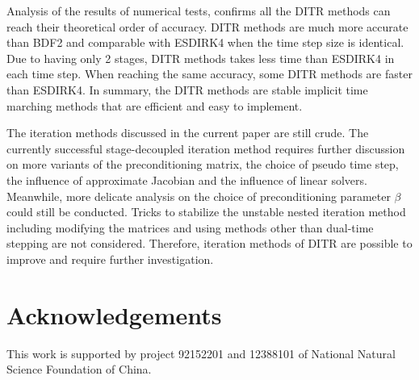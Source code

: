 Analysis of the results of numerical tests, confirms
all the DITR methods can reach their theoretical order of accuracy.
DITR methods are much more accurate than
BDF2 and comparable with ESDIRK4 when the time step size is
identical.
Due to having only 2 stages, DITR methods takes less time than ESDIRK4
in each time step.
When reaching the same accuracy, some DITR methods are faster than ESDIRK4.
In summary, the DITR methods are stable implicit time marching methods
that are efficient and easy to implement.

The iteration methods discussed in the current paper are still crude.
The currently successful stage-decoupled iteration method
requires further discussion on
more variants of the preconditioning matrix,
the choice of pseudo time step, the influence of approximate
Jacobian and the influence of linear solvers.
Meanwhile, more delicate analysis on the choice of preconditioning parameter
$\beta$ could still be conducted.
Tricks to stabilize the unstable nested iteration method
including modifying the matrices and
using methods other than dual-time stepping are not considered.
Therefore, iteration methods of DITR are possible to improve and
require further investigation.


\section*{Acknowledgements}
This work is supported by project 92152201 and 12388101 of
National Natural Science Foundation of China.